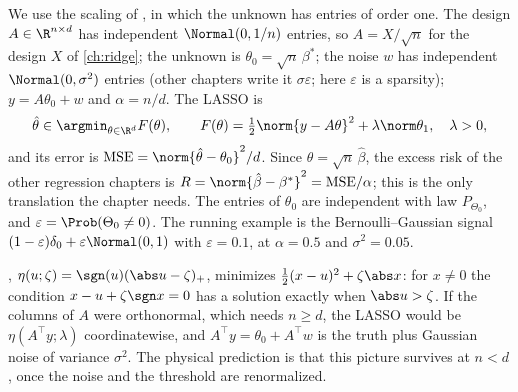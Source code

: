 \begin{refsection}
We use the scaling of \textcite{BayatiMontanari2012}, in which the unknown has entries of order one. The design $A\in\R^{n\times d}$ has independent $\Normal(0,1/n)$ entries, so $A=X/\sqrt n$ for the design $X$ of \cref{ch:ridge}; the unknown is $\theta_0=\sqrt n\,\beta^*$; the noise $w$ has independent $\Normal(0,\sigma^2)$ entries (other chapters write it $\sigma\varepsilon$; here $\varepsilon$ is a sparsity); $y=A\theta_0+w$ and $\alpha=n/d$. The LASSO is
\begin{equation}\label{eq:lasso:lasso}
\hat\theta\in\argmin_{\theta\in\R^d}F(\theta),\qquad F(\theta)=\tfrac12\norm{y-A\theta}^2+\lambda\norm\theta_1,\quad\lambda>0,
\end{equation}
and its error is $\mathrm{MSE}=\norm{\hat\theta-\theta_0}^2/d$. Since $\hat\theta=\sqrt n\,\hat\beta$, the excess risk of the other regression chapters is $R=\norm{\hat\beta-\beta^*}^2=\mathrm{MSE}/\alpha$; this is the only translation the chapter needs. The entries of $\theta_0$ are independent with law $P_{\Theta_0}$, and $\varepsilon=\Prob(\Theta_0\ne0)$. The running example is the Bernoulli--Gaussian signal $(1-\varepsilon)\delta_0+\varepsilon\Normal(0,1)$ with $\varepsilon=0.1$, at $\alpha=0.5$ and $\sigma^2=0.05$.

, $\eta(u;\zeta)=\sgn(u)(\abs u-\zeta)_+$, minimizes $\frac12(x-u)^2+\zeta\abs x$: for $x\ne0$ the condition $x-u+\zeta\sgn x=0$ has a solution exactly when $\abs u>\zeta$. If the columns of $A$ were orthonormal, which needs $n\ge d$, the LASSO would be $\eta(A^\top y;\lambda)$ coordinatewise, and $A^\top y=\theta_0+A^\top w$ is the truth plus Gaussian noise of variance $\sigma^2$. The physical prediction is that this picture survives at $n<d$, once the noise and the threshold are renormalized.


\end{refsection}

